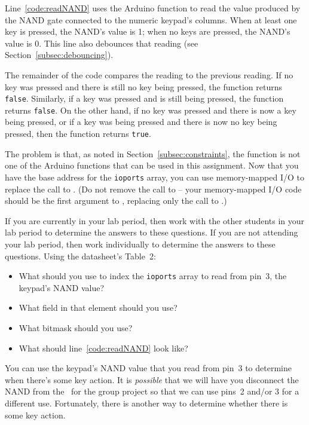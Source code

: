 Line~\ref{code:readNAND} uses the Arduino function  to read the value produced by the NAND gate connected to the numeric keypad's columns.
When at least one key is pressed, the NAND's value is 1;
when no keys are pressed, the NAND's value is 0.
This line also debounces that reading (see Section~\ref{subsec:debouncing}).

The remainder of the code compares the reading to the previous reading.
If no key was pressed and there is still no key being pressed, the function returns \lstinline{false}.
Similarly, if a key was pressed and is still being pressed, the function returns \lstinline{false}.
On the other hand, if no key was pressed and there is now a key being pressed, or if a key was being pressed and there is now no key being pressed, then the function returns \lstinline{true}.

The problem is that, as noted in Section~\ref{subsec:constraints}, the  function is not one of the Arduino functions that can be used in this assignment.
Now that you have the base address for the \lstinline{ioports} array, you can use memory-mapped I/O to replace the call to .
(Do not remove the call to  -- your memory-mapped I/O code should be the first argument to , replacing only the call to .)

If you are currently in your lab period, then work with the other students in your lab period to determine the answers to these questions.
If you are not attending your lab period, then work individually to determine the answers to these questions.
Using the datasheet's Table~2:
\begin{itemize}
    \item What should you use to index the \lstinline{ioports} array to read from pin~3, the keypad's NAND value?
    \item What field in that element should you use?
    \item What bitmask should you use?
    \item What should line~\ref{code:readNAND} look like?
\end{itemize}

You can use the keypad's NAND value that you read from pin~3 to determine when there's some key action.
It is \textit{possible} that we will have you disconnect the NAND from the \developmentboard\ for the group project so that we can use pins~2 and/or 3 for a different use.
Fortunately, there is another way to determine whether there is some key action.

